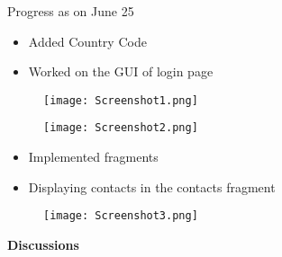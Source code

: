 \documentclass{beamer}
\begin{document}
\begin{frame}{Progress as on June 25}
\begin{itemize}
    \item Added Country Code
    \item Worked on the GUI of login page
\end{itemize}
    
\end{frame}
\begin{frame}
\begin{figure}[H]
\centering
\texttt{[image: Screenshot1.png]}
\end{figure}

\end{frame}

\begin{frame}
\begin{figure}[H]
\centering
\texttt{[image: Screenshot2.png]}
\end{figure}
\end{frame}
\begin{frame}{}
\begin{itemize}
    \item Implemented fragments
    \item Displaying contacts in the contacts fragment
\end{itemize}
    
\end{frame}
\begin{frame}
\begin{figure}[H]
\centering
\texttt{[image: Screenshot3.png]}
\end{figure}
\end{frame}


\begin{frame}
\textbf{Discussions}
\end{frame}
\end{document}

